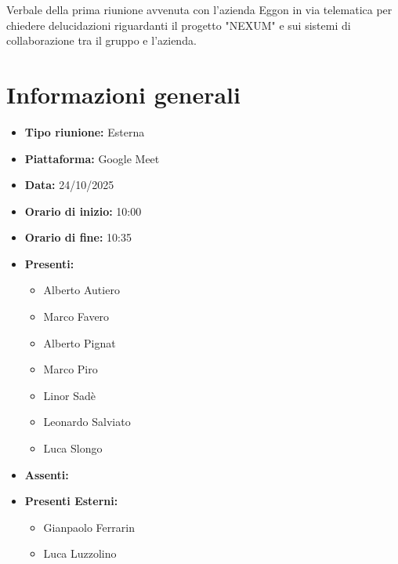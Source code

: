 \documentclass[a4paper,12pt]{article}
\begin{document}
\vspace{0.5cm}

\begin{center}
\begin{tcolorbox}[colback=secondaryblue!10,colframe=secondaryblue,width=0.9\textwidth,arc=3mm,boxrule=0.8pt,title={\bfseries Abstract}]
Verbale della prima riunione avvenuta con l'azienda Eggon in via telematica per chiedere delucidazioni riguardanti il progetto "NEXUM" e sui sistemi di collaborazione tra il gruppo e l'azienda.
\end{tcolorbox}
\end{center}

\newpage

\tableofcontents
\newpage


\section{Informazioni generali}

\begin{itemize}
    \item \textbf{Tipo riunione:} Esterna
    \item \textbf{Piattaforma:} Google Meet
    \item \textbf{Data:} 24/10/2025
    \item \textbf{Orario di inizio:} 10:00
    \item \textbf{Orario di fine:} 10:35
    \item \textbf{Presenti:}
    \begin{itemize}[leftmargin=1.5em, itemsep=3pt, label={\rule[0.5ex]{0.4em}{0.4em}}]
        \item Alberto Autiero
        \item Marco Favero
        \item Alberto Pignat
        \item Marco Piro
        \item Linor Sadè
        \item Leonardo Salviato
        \item Luca Slongo
    \end{itemize}
    \item \textbf{Assenti:}
    \item \textbf{Presenti Esterni:}
    \begin{itemize}[leftmargin=1.5em, itemsep=3pt, label={\rule[0.5ex]{0.4em}{0.4em}}]
        \item Gianpaolo Ferrarin
        \item Luca Luzzolino
    \end{itemize}

\end{itemize}
\end{document}
